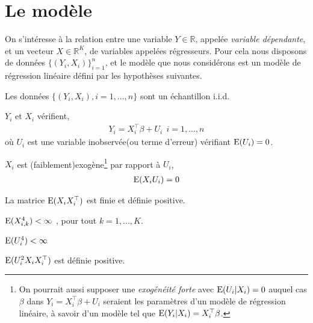 \newpage

\tableofcontents

\newpage

\section{Le modèle}
On s'intéresse à la relation entre une variable $Y\in \mathbb{R}$, appelée \emph{variable dépendante}, et un vecteur $X\in \mathbb{R}^K$, de variables appelées  régresseurs. Pour cela nous disposons de données $\{(Y_i, X_i)\}_{i=1}^n$, et le modèle que nous considérons est un modèle de régression linéaire défini par les hypothèses suivantes.
\begin{condition}
Les données  $\{(Y_i, X_i), i = 1,...,n\}$ sont un échantillon i.i.d.
\label{cond1}
\end{condition}
\begin{condition} $Y_i$  et $X_i$ vérifient,
\begin{align*} 
Y_i= X_i^\top\beta + U_i \ \ i = 1,...,n
\end{align*}
où $U_i$ est une variable inobservée(ou terme d'erreur) vérifiant $\operatorname{E}(U_i) = 0$.
\label{cond2} 
\end{condition}
\begin{condition}$X_i$ est (faiblement)exogène\footnote{On pourrait aussi supposer une \emph{exogénéité forte} avec $\operatorname{E}(U_i|X_i) = 0$
    auquel cas $\beta$ dans $Y_i = X_i^\top\beta + U_i$ seraient les paramètres d'un modèle de régression linéaire, à savoir d'un modèle tel 
    que $\operatorname{E}(Y_i|X_i) = X_i^\top \beta $.} par rapport à $U_i$,
\begin{align*}
\operatorname{E}(X_iU_i) = 0
\end{align*}
\label{cond3} 
\end{condition}
\begin{condition} 
La matrice $\operatorname{E}(X_iX_i^\top)$ est finie et définie positive.
\label{cond4}
\end{condition}
\begin{condition}
$\operatorname{E}(X_{i,k}^4) < \infty$ , pour tout $k=1,...,K$.
\label{cond5}
\end{condition}
\begin{condition}
$\operatorname{E}(U_i^4) < \infty$
\label{cond6}
\end{condition}
\begin{condition}
$\operatorname{E}(U_i^2X_iX_i^\top)$ est définie positive.
\label{cond7}
\end{condition}

